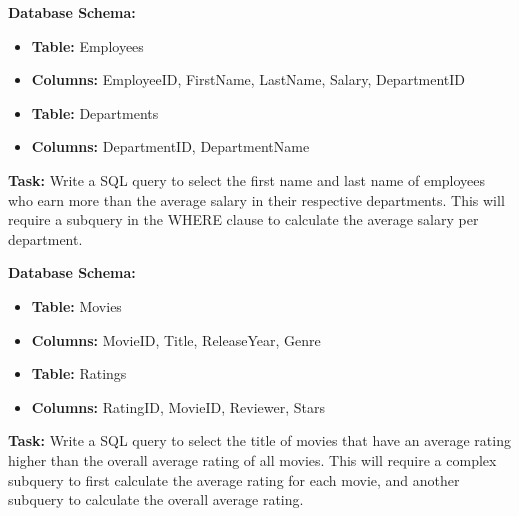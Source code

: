 \begin{exercisebox}
\noindent \textbf{Database Schema:} 
\begin{itemize}
    \item \textbf{Table:} Employees
    \item \textbf{Columns:} EmployeeID, FirstName, LastName, Salary, DepartmentID
    \item \textbf{Table:} Departments
    \item \textbf{Columns:} DepartmentID, DepartmentName
\end{itemize}

\noindent \textbf{Task:} Write a SQL query to select the first name and last name of employees who earn more than the average salary in their respective departments. This will require a subquery in the WHERE clause to calculate the average salary per department.\\
\end{exercisebox}

\begin{exercisebox}
\noindent \textbf{Database Schema:}
\begin{itemize}
    \item \textbf{Table:} Movies
    \item \textbf{Columns:} MovieID, Title, ReleaseYear, Genre
    \item \textbf{Table:} Ratings
    \item \textbf{Columns:} RatingID, MovieID, Reviewer, Stars
\end{itemize}

\noindent \textbf{Task:} Write a SQL query to select the title of movies that have an average rating higher than the overall average rating of all movies. This will require a complex subquery to first calculate the average rating for each movie, and another subquery to calculate the overall average rating.\\
\end{exercisebox}
